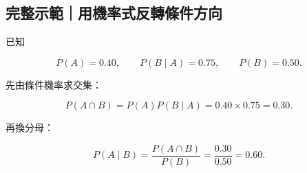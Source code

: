 \documentclass[11pt,a4paper]{article}
\begin{document}
\begin{HandoutWorkedExample}

\subsection{完整示範｜用機率式反轉條件方向}\label{ux5b8cux6574ux793aux7bc4ux7528ux6a5fux7387ux5f0fux53cdux8f49ux689dux4ef6ux65b9ux5411}

已知

\[
P(A)=0.40,
\qquad
P(B\mid A)=0.75,
\qquad
P(B)=0.50.
\]

先由條件機率求交集：

\[
P(A\cap B)=P(A)P(B\mid A)=0.40\times0.75=0.30.
\]

再換分母：

\[
P(A\mid B)=\frac{P(A\cap B)}{P(B)}
=\frac{0.30}{0.50}
=\boxed{0.60}.
\]

\end{HandoutWorkedExample}
\end{document}

